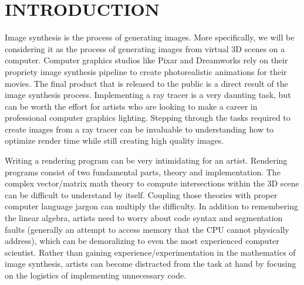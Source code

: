 %
%
%



\pagestyle{plain} %
\setcounter{page}{1}


\chapter{\uppercase {Introduction}}
Image synthesis is the process of generating images.  More specifically, we will be considering it as the process of generating images from virtual 3D scenes on a computer.  Computer graphics studios like Pixar and Dreamworks rely on their propriety image synthesis pipeline to create photorealistic animations for their movies.  The final product that is released to the public is a direct result of the image synthesis process.  Implementing a ray tracer is a very daunting task, but can be worth the effort for artists who are looking to make a career in professional computer graphics lighting.  Stepping through the tasks required to create images from a ray tracer can be invaluable to understanding how to optimize render time while still creating high quality images.

Writing a rendering program can be very intimidating for an artist. Rendering programs consist of two fundamental parts, theory and implementation.  The complex vector/matrix math theory to compute intersections within the 3D scene can be difficult to understand by itself.  Coupling those theories with proper computer language jargon can multiply the difficulty.  In addition to remembering the linear algebra, artists need to worry about code syntax and segmentation faults (generally an attempt to access memory that the CPU cannot physically address), which can be demoralizing to even the most experienced computer scientist.  Rather than gaining experience/experimentation in the mathematics of image synthesis, artists can become distracted from the task at hand by focusing on the logistics of implementing unnecessary code.

